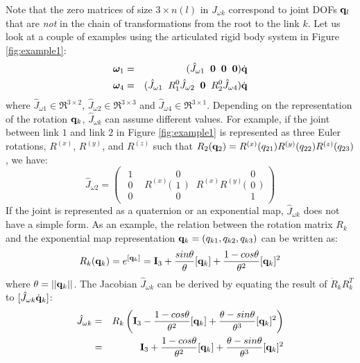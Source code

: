 Note that the zero matrices  of size $3\times n(l)$ in $J_{\omega k}$ correspond to
joint DOFs $\mathbf{q}_l$ that are \emph{not} in the chain of transformations from the root to the
link $k$. 
Let us look at a couple of examples using the articulated
rigid body system in Figure \ref{fig:example1}:
\begin{eqnarray}
\bm{\omega}_1 &=& (\hat{J}_{\omega 1} \;\; \mathbf{0}
\;\;\mathbf{0}\;\;\mathbf{0}) \dot{\mathbf{q}}  \nonumber \\
\bm{\omega}_4 &=& (\hat{J}_{\omega 1} \;\; R^0_1\hat{J}_{\omega 2} \;\;
\mathbf{0} \;\;
R^0_2 \hat{J}_{\omega 4}) \dot{\mathbf{q}} \nonumber
\end{eqnarray}
where $\hat{J}_{\omega 1} \in \Re^{3\times2}$, $\hat{J}_{\omega 2} \in \Re^{3\times3}$ and $\hat{J}_{\omega 4} \in \Re^{3\times1}$.
Depending on the representation of the rotation $\mathbf{q}_k$,
$\hat{J}_{\omega k}$ can assume different values. For example, if the joint
between link $1$ and link $2$ in Figure \ref{fig:example1} is
represented as three Euler rotations, $R^{(x)}$, $R^{(y)}$, and
$R^{(z)}$ such that $R_2(\mathbf{q}_2)= R^{(x)}(q_{21}) R^{(y)}(q_{22}) R^{(z)}(q_{23})$, we have:
\begin{equation}
\hat{J}_{\omega 2} = 
\begin{pmatrix}
\begin{array}{c}
1\\
0\\
0
\end{array}
&
R^{(x)} \Bigg (
\begin{array}{c}
0\\
1\\
0
\end{array} 
\Bigg )
&
R^{(x)} R^{(y)}\Bigg (
\begin{array}{c}
0\\
0\\
1
\end{array} 
\Bigg )
\end{pmatrix}
\end{equation}
If the joint is represented as a quaternion or an
exponential map, $\hat{J}_{\omega k}$ does not have a simple form. As an example, the relation between the rotation matrix $R_k$ and the exponential map representation $\mathbf{q}_k=(q_{k1},q_{k2},q_{k3})$ can be written as:
\begin{equation}
R_k(\mathbf{q}_k) = e^{[\mathbf{q}_k]} = \mathbf{I}_3 + \frac{sin \theta}{\theta} [{\mathbf{q}}_k] + \frac{1-cos \theta}{\theta^2}[{\mathbf{q}}_k]^2
\end{equation}
where $\theta = ||\mathbf{q}_k ||$. The Jacobian $\hat{J}_{\omega k}$ can be derived by equating the result of $\dot{R}_k R_k^T$ to $[\hat{J}_{\omega k} \dot{\mathbf{q}}_k]$:
\begin{eqnarray}
\nonumber
\hat{J}_{\omega k} & = & R_k \left ( \mathbf{I}_3 - \frac{1-cos\theta}{\theta^2}[\mathbf{q}_k] + \frac{\theta - sin \theta}{\theta^3} [\mathbf{q}_k]^2 \right )\\
 & = & \mathbf{I}_3 + \frac{1-cos\theta}{\theta^2}[\mathbf{q}_k] + \frac{\theta - sin \theta}{\theta^3} [\mathbf{q}_k]^2
\end{eqnarray}

